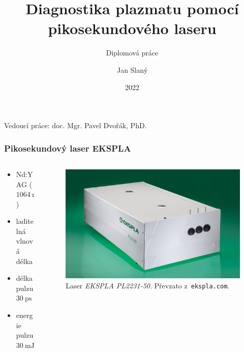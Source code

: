 \documentclass{beamer}
\title[Laserová diagnostika plazmatu]
{Diagnostika plazmatu pomocí pikosekundového laseru}
\subtitle{Diplomová práce}
\date{2022}
\author{Jan Slaný}
\institute[PřF MUNI]{Přírodovědecká fakulta Masarykovy univerzity\\
	Ústav fyzikální elektroniky}
\begin{document}
\begin{frame}[plain]
	\titlepage
	\footnotesize
	Vedoucí práce: doc. Mgr. Pavel Dvořák, PhD.
\end{frame}

\begin{frame}
	\frametitle{Pikosekundový laser EKSPLA}
	\begin{columns}
	\begin{column}{0.5\textwidth}
		\begin{itemize}
			\item Nd:YAG ($\SI{1064}{\nano\metre}$)
			\item laditelná vlnová délka
			\item délka pulzu $\SI{30}{\pico\second}$
			\item energie pulzu $\SI{30}{\milli\joule}$
		\end{itemize}
	\end{column}
	\begin{column}{0.5\textwidth}
		\begin{figure}
			\centering
			\includegraphics[width=\textwidth]{laser}
			\caption{Laser \emph{EKSPLA PL2231-50}.
				Převzato z~\texttt{ekspla.com}.}
		\end{figure}
	\end{column}
	\end{columns}
\end{frame}
\end{document}
